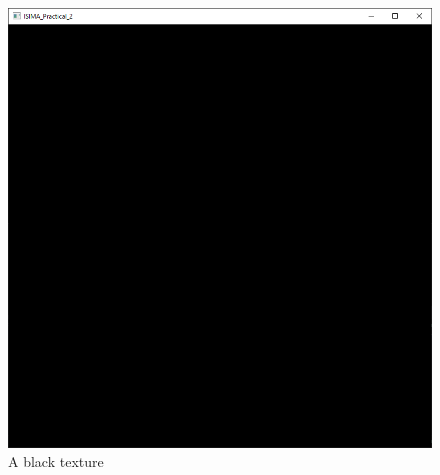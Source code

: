 \documentclass{article}
\begin{document}
\begin{figure}[h]
	\centering
	\includegraphics[scale=0.2]{images/black.png}
	\caption{A black texture}
\end{figure}
\end{document}
